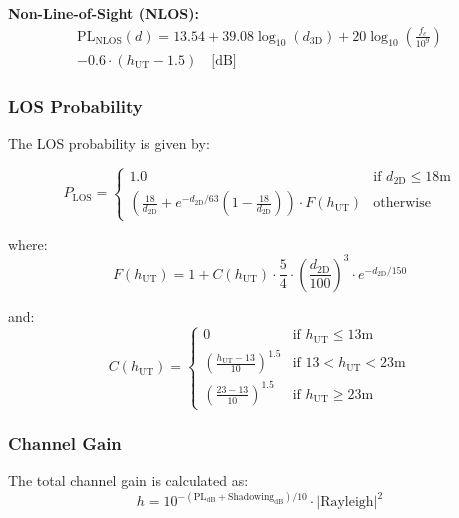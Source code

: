 \documentclass[11pt,a4paper]{article}
\begin{document}
\textbf{Non-Line-of-Sight (NLOS):}
\begin{multline}
\text{PL}_{\text{NLOS}}(d) = 13.54 + 39.08 \log_{10}(d_{\text{3D}}) + 20 \log_{10}\left(\frac{f_c}{10^9}\right) \\
- 0.6 \cdot (h_{\text{UT}} - 1.5) \quad \text{[dB]}
\end{multline}

\subsubsection{LOS Probability}

The LOS probability is given by:

\begin{equation}
P_{\text{LOS}} = \begin{cases}
1.0 & \text{if } d_{\text{2D}} \leq 18\text{m} \\
\left(\frac{18}{d_{\text{2D}}} + e^{-d_{\text{2D}}/63}\left(1-\frac{18}{d_{\text{2D}}}\right)\right) \cdot F(h_{\text{UT}}) & \text{otherwise}
\end{cases}
\end{equation}

where:
\begin{equation}
F(h_{\text{UT}}) = 1 + C(h_{\text{UT}}) \cdot \frac{5}{4} \cdot \left(\frac{d_{\text{2D}}}{100}\right)^3 \cdot e^{-d_{\text{2D}}/150}
\end{equation}

and:
\begin{equation}
C(h_{\text{UT}}) = \begin{cases}
0 & \text{if } h_{\text{UT}} \leq 13\text{m} \\
\left(\frac{h_{\text{UT}} - 13}{10}\right)^{1.5} & \text{if } 13 < h_{\text{UT}} < 23\text{m} \\
\left(\frac{23 - 13}{10}\right)^{1.5} & \text{if } h_{\text{UT}} \geq 23\text{m}
\end{cases}
\end{equation}

\subsubsection{Channel Gain}

The total channel gain is calculated as:
\begin{equation}
h = 10^{-(\text{PL}_{\text{dB}} + \text{Shadowing}_{\text{dB}})/10} \cdot |\text{Rayleigh}|^2
\end{equation}
\end{document}
